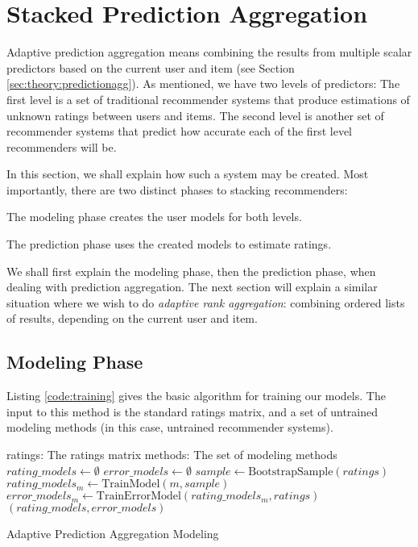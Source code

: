\section{Stacked Prediction Aggregation}

Adaptive prediction aggregation means combining the results
from multiple scalar predictors based on the current user and item
(see Section \ref{sec:theory:predictionagg}).
As mentioned, we have two levels of predictors:
The first level is a set of traditional recommender systems
that produce estimations of unknown ratings between users and items.
The second level is another set of recommender systems 
that predict how accurate each of the first level recommenders will be.

In this section, we shall explain how such a system may be created.
Most importantly, there are two distinct phases to stacking recommenders:

\begin{enumerate*}
  \item The modeling phase creates the user models for both levels.
  \item The prediction phase uses the created models to estimate ratings.
\end{enumerate*}

We shall first explain the modeling phase, then the prediction phase,
when dealing with prediction aggregation.
The next section will explain a similar situation where
we wish to do \emph{adaptive rank aggregation}: 
combining ordered lists of results, depending on the current user and item.


\subsection{Modeling Phase}

Listing \ref{code:training} gives the basic algorithm for training
our models. The input to this method is the standard ratings matrix,
and a set of untrained modeling methods (in this case,
untrained recommender systems).

\begin{algorithm}
  \begin{algorithmic}[1]
  \REQUIRE ratings: The ratings matrix
  \REQUIRE methods: The set of modeling methods
  \ENSURE
    \STATE $rating\_models \gets \emptyset$
    \STATE $error\_models \gets \emptyset$
      \STATE $sample \gets \mathrm{BootstrapSample}(ratings)$
      \STATE $rating\_models_m \gets \mathrm{TrainModel}(m, sample)$
      \STATE $error\_models_m  \gets \mathrm{TrainErrorModel}(rating\_models_m, ratings)$
    \ENDFOR 
  \RETURN $(rating\_models, error\_models)$
  \end{algorithmic}
  \caption[Adaptive Prediction Aggregation Modeling]{Adaptive Prediction Aggregation Modeling
  }
  \label{code:training}
\end{algorithm}


